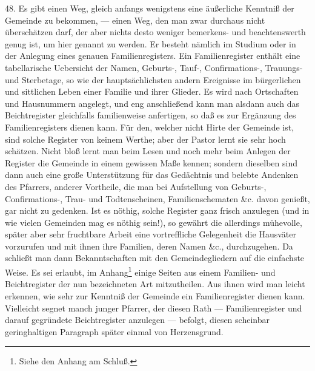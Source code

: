 48. Es gibt einen Weg, gleich anfangs wenigstens eine äußerliche Kenntniß der Gemeinde zu bekommen, — einen Weg, den man zwar durchaus nicht überschätzen darf, der aber nichts desto weniger bemerkens- und beachtenswerth genug ist, um hier genannt zu werden. Er besteht nämlich im Studium oder in der Anlegung eines genauen Familienregisters. Ein Familienregister enthält eine tabellarische Uebersicht der Namen, Geburts-, Tauf-, Confirmations-, Trauungs- und Sterbetage, so wie der hauptsächlichsten andern Ereignisse im bürgerlichen und sittlichen Leben einer Familie und ihrer Glieder. Es wird nach Ortschaften und Hausnummern angelegt, und eng anschließend
kann man alsdann auch das Beichtregister gleichfalls familienweise anfertigen, so daß es zur Ergänzung des Familienregisters dienen kann. Für den, welcher nicht Hirte der Gemeinde ist, sind solche Register von keinem Werthe; aber der Pastor lernt sie sehr hoch schätzen. Nicht bloß lernt man beim Lesen und noch mehr beim Anlegen der Register die Gemeinde in einem gewissen Maße kennen; sondern dieselben sind dann auch eine große Unterstützung für das Gedächtnis und belebte Andenken des Pfarrers, anderer Vortheile, die man bei Aufstellung von Geburts-, Confirmations-, Trau- und Todtenscheinen, Familienschematen \&c. davon genießt, gar nicht zu gedenken. Ist es nöthig, solche Register ganz frisch anzulegen (und in wie vielen Gemeinden mag es nöthig sein!), so gewährt die allerdings mühevolle, später aber sehr fruchtbare Arbeit eine vortreffliche Gelegenheit die Hausväter vorzurufen und mit ihnen ihre Familien, deren Namen \&c., durchzugehen. Da schließt man dann Bekanntschaften mit den Gemeindegliedern auf die einfachste Weise. Es sei erlaubt, im Anhang\footnote{Siehe den Anhang am Schluß.} einige Seiten aus einem Familien- und Beichtregister der nun bezeichneten Art mitzutheilen. Aus ihnen wird man leicht erkennen, wie sehr zur Kenntniß der Gemeinde ein Familienregister dienen kann. Vielleicht segnet manch junger Pfarrer, der diesen Rath — Familienregister und darauf gegründete Beichtregister anzulegen — befolgt, diesen scheinbar geringhaltigen Paragraph später einmal von Herzensgrund.

